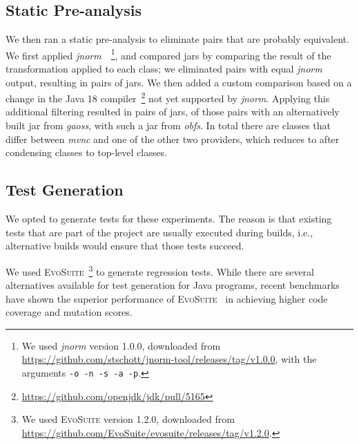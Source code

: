 \documentclass[conference]{IEEEtran}
\makeatletter
\newcommand{\evosuite}{\textsc{EvoSuite}\@\xspace}
\newcommand{\inputgen}[1]{\unskip}
\makeatother
\begin{document}
\subsection{Static Pre-analysis}

We then ran a static pre-analysis to eliminate pairs that are probably equivalent. We first applied \textit{jnorm}~\cite{schott2024JNorm}~\footnote{We used \textit{jnorm} version 1.0.0, downloaded from \url{https://github.com/stschott/jnorm-tool/releases/tag/v1.0.0}, with the arguments \texttt{-o -n -s -a -p}.}, and compared jars by comparing the result of the transformation applied to each class; we eliminated pairs with equal \textit{jnorm} output, resulting in \inputgen{num-jar-pairs-after-jnorm2} pairs of jars. We then added a custom comparison based on a change in the Java 18 compiler~\footnote{\url{https://github.com/openjdk/jdk/pull/5165}} not yet supported by \textit{jnorm}. Applying this additional filtering resulted in \inputgen{num-jar-pairs-after-invokevirtual-invokeinterface} pairs of jars, \inputgen{num-jar-pairs-after-invokevirtual-invokeinterface-gaoss} of those pairs with an alternatively built jar from \textit{gaoss}, \inputgen{num-jar-pairs-after-invokevirtual-invokeinterface-obfs} with such a jar from \textit{obfs}.
In total there are \inputgen{num-class-pairs-after-invokevirtual-invokeinterface} classes that differ between \textit{mvnc} and one of the other two providers, which reduces to \inputgen{num-top-level-class-pairs-after-invokevirtual-invokeinterface} after condensing classes to top-level classes.



\subsection{Test Generation}

We opted to generate tests for these experiments. The reason is that existing tests that are part of the project are usually executed during builds, i.e., alternative builds would ensure that those tests succeed. 

We used \evosuite~\footnote{We used \evosuite version 1.2.0, downloaded from \url{https://github.com/EvoSuite/evosuite/releases/tag/v1.2.0}.} to generate regression tests. While there are several alternatives available for test generation for Java programs, recent benchmarks have shown the superior performance of \evosuite~\cite{jahangirova2023sbft} in achieving higher code coverage and mutation scores. 
\end{document}
